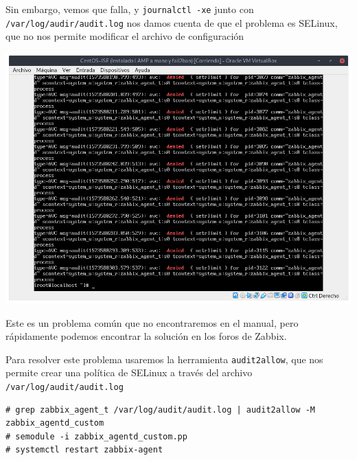 \documentclass[12pt, spanish]{article}
\begin{document}
Sin embargo, vemos que falla, y \texttt{journalctl -xe} junto con \texttt{/var/log/audir/audit.log} nos damos cuenta de que el problema es SELinux, que no nos permite modificar el archivo de configuración
\begin{center}
\includegraphics[scale=0.25]{selinux.png}
\end{center}

Este es un problema común que no encontraremos en el manual, pero rápidamente podemos encontrar la solución en los foros de Zabbix\cite{zabbixSElinux}.

Para resolver este problema usaremos la herramienta \texttt{audit2allow}\cite{audit2allow_man}, que nos permite crear una política de SELinux a través del archivo \texttt{/var/log/audit/audit.log}
\begin{verbatim}
# grep zabbix_agent_t /var/log/audit/audit.log | audit2allow -M zabbix_agentd_custom
# semodule -i zabbix_agentd_custom.pp
# systemctl restart zabbix-agent
\end{verbatim}
\end{document}
